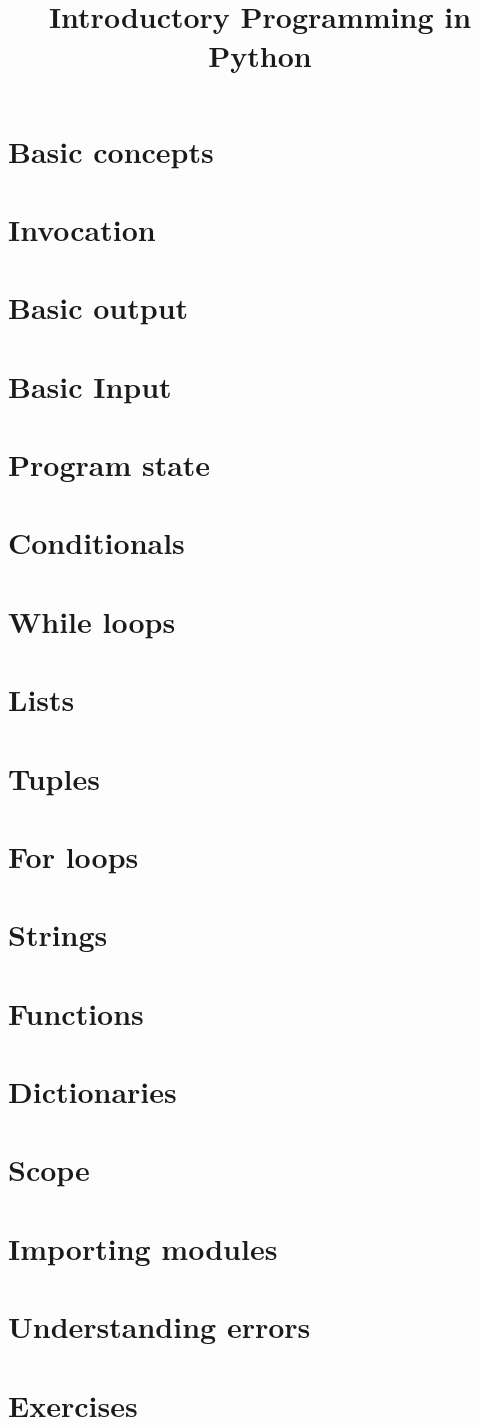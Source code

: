 \documentclass[a4paper,11pt]{report}
\title{Introductory Programming in Python}
\begin{document}
\maketitle
\chapter{Basic concepts}
    
\chapter{Invocation}
    
\chapter{Basic output}
    
\chapter{Basic Input}
    
\chapter{Program state}
    
\chapter{Conditionals}
    
\chapter{While loops}
    
\chapter{Lists}
    
\chapter{Tuples}
    
\chapter{For loops}
    
\chapter{Strings}
    
\chapter{Functions}
    
\chapter{Dictionaries}
    
\chapter{Scope}
    
\chapter{Importing modules}
    
\chapter{Understanding errors}
    
\chapter{Exercises}
    
\end{document}
